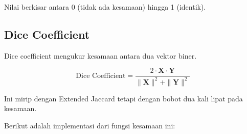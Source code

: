 \documentclass[
  oneside]{book}
\begin{document}
Nilai berkisar antara 0 (tidak ada kesamaan) hingga 1 (identik).

\subsection{\texorpdfstring{\textbf{Dice Coefficient}}{Dice Coefficient}}\label{dice-coefficient}

Dice coefficient mengukur kesamaan antara dua vektor biner.

\[
\text{Dice Coefficient} = \frac{2 \cdot \mathbf{X} \cdot \mathbf{Y}}{\|\mathbf{X}\|^2 + \|\mathbf{Y}\|^2}
\]

Ini mirip dengan Extended Jaccard tetapi dengan bobot dua kali lipat pada kesamaan.

Berikut adalah implementasi dari fungsi kesamaan ini:
\end{document}
